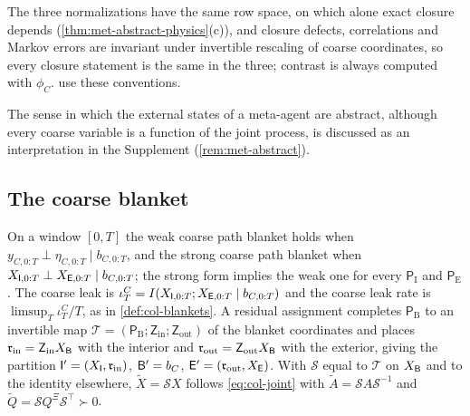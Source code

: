 The three normalizations have the same row space, on which alone exact closure depends (\cref{thm:met-abstract-physics}(c)), and closure defects, correlations and Markov errors are invariant under invertible rescaling of coarse coordinates, so every closure statement is the same in the three; contrast is always computed with $\phi_C$.  use these conventions.

The sense in which the external states of a meta-agent are abstract, although every coarse variable is a function of the joint process, is discussed as an interpretation in the Supplement (\cref{rem:met-abstract}).

\subsection{The coarse blanket}\label{sec:met-blanket}

\begin{definition}\label{def:met-coarse-blanket}
On a window $[0,T]$ the weak coarse path blanket holds when $y_{C,0:T}\perp\eta_{C,0:T}\mid b_{C,0:T}$, and the strong coarse path blanket when $X_{\mathsf{I},0:T}\perp X_{\mathsf{E},0:T}\mid b_{C,0:T}$; the strong form implies the weak one for every $\mathsf P_{\mathrm I}$ and $\mathsf P_{\mathrm E}$. The coarse leak is $\iota^C_T=I(X_{\mathsf{I},0:T};X_{\mathsf{E},0:T}\mid b_{C,0:T})$ and the coarse leak rate is $\limsup_T\iota^C_T/T$, as in \cref{def:col-blankets}. A residual assignment completes $\mathsf P_{\mathrm B}$ to an invertible map $\mathcal T=(\mathsf P_{\mathrm B};\mathsf Z_{\mathrm{in}};\mathsf Z_{\mathrm{out}})$ of the blanket coordinates and places $\mathfrak r_{\mathrm{in}}=\mathsf Z_{\mathrm{in}}X_{\mathsf{B}}$ with the interior and $\mathfrak r_{\mathrm{out}}=\mathsf Z_{\mathrm{out}}X_{\mathsf{B}}$ with the exterior, giving the partition $\mathsf{I}'=(X_{\mathsf{I}},\mathfrak r_{\mathrm{in}})$, $\mathsf{B}'=b_C$, $\mathsf{E}'=(\mathfrak r_{\mathrm{out}},X_{\mathsf{E}})$. With $\mathcal S$ equal to $\mathcal T$ on $X_{\mathsf{B}}$ and to the identity elsewhere, $\tilde X=\mathcal SX$ follows \eqref{eq:col-joint} with $\tilde A=\mathcal SA\mathcal S^{-1}$ and $\tilde Q=\mathcal SQ^{\Xi}\mathcal S^\top\succ0$.
\end{definition}

